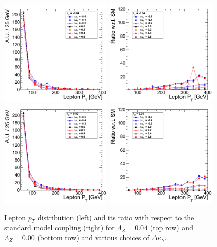 \begin{figure}[h!t]
  {\centering
    \includegraphics[width=0.48\textwidth]{figs/LeptonpT_m004.png}
    \includegraphics[width=0.48\textwidth]{figs/LeptonpT_m004_ratio.png}
    \includegraphics[width=0.48\textwidth]{figs/LeptonpT_000.png}
    \includegraphics[width=0.48\textwidth]{figs/LeptonpT_000_ratio.png}
    \caption{Lepton $p_T$ distribution (left) and its ratio with respect to 
    the standard model coupling (right) for $\Lambda_Z = 0.04$ (top row) and 
    $\Lambda_Z = 0.00$ (bottom row)
    and various choices of $\Delta{\kappa_\gamma}$.}
    \label{fig:ww_LeptonpT_atgcRatio004}}
\end{figure}
